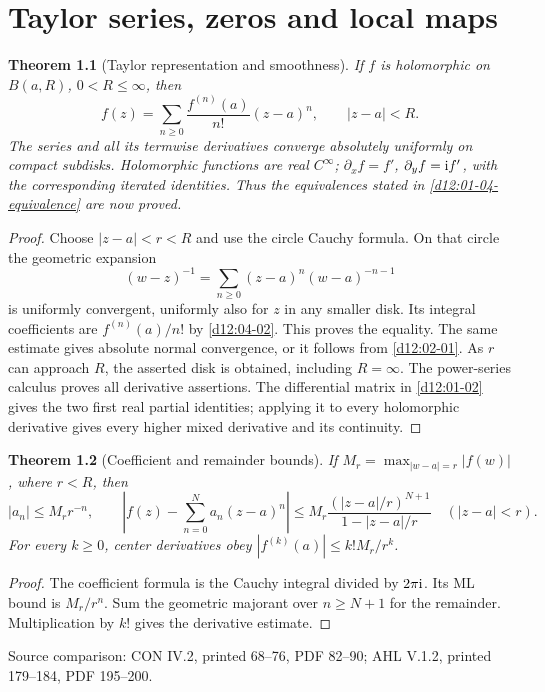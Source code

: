 \documentclass[11pt,a4paper,openany]{book}
\newtheorem{theorem}{Theorem}[chapter]
\theoremstyle{definition}
\theoremstyle{remark}\newtheorem{remark}[theorem]{Remark}
\newcommand{\family}[1]{}
\newcommand{\source}[1]{\par\begingroup\small\sffamily\color{black!65}Source comparison: #1\par\endgroup}
\begin{document}
\chapter{Taylor series, zeros and local maps}\label{ch:d12-05}

\begin{theorem}[Taylor representation and smoothness]\family{D12.05.01}\label{d12:05-01}
If \(f\) is holomorphic on \(B(a,R)\), \(0<R\le\infty\), then
\[
 f(z)=\sum_{n\ge0}\frac{f^{(n)}(a)}{n!}(z-a)^n,\qquad |z-a|<R.
\]
The series and all its termwise derivatives converge absolutely uniformly
on compact subdisks. Holomorphic functions are real \(C^\infty\);
\(\partial_x f=f'\), \(\partial_y f=\mathrm i f'\), with the corresponding
iterated identities. Thus the equivalences stated in
\cref{d12:01-04-equivalence} are now proved.
\end{theorem}
\begin{proof}
Choose \(|z-a|<r<R\) and use the circle Cauchy formula.
On that circle the geometric expansion
\[
 (w-z)^{-1}=\sum_{n\ge0}(z-a)^n(w-a)^{-n-1}
\]
is uniformly convergent, uniformly also for \(z\) in any smaller disk.
Its integral coefficients are \(f^{(n)}(a)/n!\) by
\cref{d12:04-02}. This proves the equality. The same estimate gives
absolute normal convergence, or it follows from \cref{d12:02-01}.
As \(r\) can approach \(R\), the asserted disk is obtained, including
\(R=\infty\). The power-series calculus proves all derivative assertions.
The differential matrix in \cref{d12:01-02} gives the two first real
partial identities; applying it to every holomorphic derivative gives
every higher mixed derivative and its continuity.
\end{proof}

\begin{theorem}[Coefficient and remainder bounds]\family{D12.05.02}\label{d12:05-02}
If \(M_r=\max_{|w-a|=r}|f(w)|\), where \(r<R\), then
\[
 |a_n|\le M_r r^{-n},\qquad
 \left|f(z)-\sum_{n=0}^Na_n(z-a)^n\right|
 \le M_r\frac{(|z-a|/r)^{N+1}}{1-|z-a|/r}
 \quad(|z-a|<r).
\]
For every \(k\ge0\), center derivatives obey
\(|f^{(k)}(a)|\le k!M_r/r^k\).
\end{theorem}
\begin{proof}
The coefficient formula is the Cauchy integral divided by \(2\pi\mathrm i\).
Its ML bound is \(M_r/r^n\). Sum the geometric majorant over
\(n\ge N+1\) for the remainder. Multiplication by \(k!\) gives the
derivative estimate.
\end{proof}
\source{CON IV.2, printed 68--76, PDF 82--90; AHL V.1.2, printed 179--184, PDF 195--200.}
\end{document}
